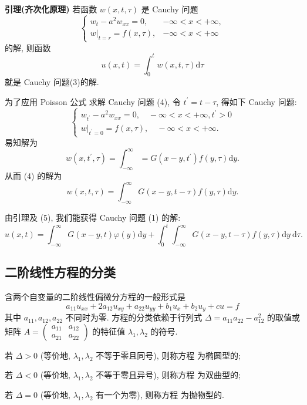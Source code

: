 \textbf{引理(齐次化原理) }若函数 $ w(x, t, \tau) $ 是 Cauchy 问题
\begin{equation*}
\left\{\begin{array}{ll}
w_{t}-a^{2} w_{x x}=0, & -\infty<x<+\infty, \\
\left.w\right|_{t=r}=f(x, \tau), & -\infty<x<+\infty
\end{array}\right.\tag{4}
\end{equation*}
的解, 则函数
$$
u(x, t)=\int_{0}^{t} w(x, t, \tau) \mathrm{d} \tau
$$
就是 Cauchy 问题(3)的解.

为了应用 Poisson 公式 求解 Cauchy 问题 (4), 令 $ t^{\prime}=t-\tau $, 得如下 Cauchy 问题:
$$
\left\{\begin{array}{l}
w_{t^{\prime}}-a^{2} w_{x x}=0, \quad-\infty<x<+\infty, t^{\prime}>0 \\
\left.w\right|_{t^{\prime}=0}=f(x, \tau), \quad-\infty<x<+\infty .
\end{array}\right.
$$
易知解为
$$
w\left(x, t^{\prime}, \tau\right)=\int_{-\infty}^{\infty}=G\left(x-y, t^{\prime}\right) f(y, \tau) \mathrm{d} y .
$$
从而 (4) 的解为
\begin{equation*}
w(x, t, \tau)=\int_{-\infty}^{\infty} G(x-y, t-\tau) f(y, \tau) \mathrm{d} y .\tag{5}
\end{equation*}

由引理及 (5), 我们能获得 Cauchy 问题 (1) 的解:
$$
u(x, t)=\int_{-\infty}^{\infty} G(x-y, t) \varphi(y) \mathrm{d} y+\int_{0}^{t} \int_{-\infty}^{\infty} G(x-y, t-\tau) f(y, \tau) \mathrm{d} y \mathrm{~d} \tau .
$$

\subsection{二阶线性方程的分类}
含两个自变量的二阶线性偏微分方程的一般形式是
$$
a_{11} u_{x x}+2 a_{12} u_{x y}+a_{22} u_{y y}+b_{1} u_{x}+b_{2} u_{y}+c u=f
$$
其中 $ a_{11}, a_{12}, a_{22} $ 不同时为零. 方程的分类依赖于行列式 $ \Delta=a_{11} a_{22}-a_{12}^{2} $ 的取值或矩阵 $ A=\left(\begin{array}{ll}a_{11} & a_{12} \\ a_{21} & a_{22}\end{array}\right) $ 的特征值 $ \lambda_{1}, \lambda_{2} $ 的符号.

若 $ \Delta>0 $ (等价地, $ \lambda_{1}, \lambda_{2} $ 不等于零且同号), 则称方程 为椭圆型的;

若 $ \Delta<0 $ (等价地, $ \lambda_{1}, \lambda_{2} $ 不等于零且异号), 则称方程 为双曲型的;

若 $ \Delta=0 $ (等价地, $ \lambda_{1}, \lambda_{2} $ 有一个为零), 则称方程  为抛物型的.